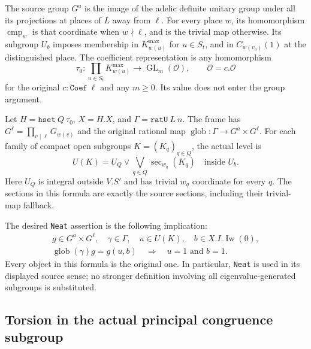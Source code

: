The source group \(G^a\) is the image of the adelic definite unitary
group under all its projections at places of \(L\) away from \(\ell\).
For every place \(w\), its homomorphism \(\operatorname{cmp}_w\) is that
coordinate when \(w\nmid\ell\), and is the trivial map otherwise.
Its subgroup \(U_b\) imposes membership in \(K_{w(u)}^{\max}\) for
\(u\in S_t\), and in \(C_{w(v_0)}(1)\) at the distinguished place.
The coefficient representation is any homomorphism
\[
 \tau _0:\prod_{u\in S_t}K_{w(u)}^{\max}
                  \longrightarrow\operatorname{GL}_m(\mathcal O),
 \qquad \mathcal O=c.\mathcal O
\]
for the original \(c:\texttt{Coef}\ \ell\) and any \(m\ge0\).
Its value does not enter the group argument.

Let \(H=\texttt{hset}\ Q\ \tau _0\), \(X=H.X\), and
\(\Gamma=\texttt{ratU}\ L\ n\).  The frame has
\(G^\ell=\prod_{v\mid\ell}G_{w(v)}\) and the original rational map
\(\operatorname{glob}:\Gamma\longrightarrow G^a\times G^\ell\).
For each family of compact open subgroups \(K=(K_q)_{q\in Q}\),
the actual level is
\begin{equation}\label{eq:ntl-level}
 U(K)=U_Q\vee\bigvee_{q\in Q}\operatorname{sec}_{w_q}(K_q)
                  \quad\text{inside }U_b.
\end{equation}
Here \(U_Q\) is integral outside \(V.S'\) and has trivial \(w_q\)
coordinate for every \(q\).  The sections in this formula are exactly
the source sections, including their trivial-map fallback.

The desired \texttt{Neat} assertion is the following implication:
\begin{equation}\label{eq:ntl-neat}
 \begin{gathered}
 g\in G^a\times G^\ell,\quad\gamma\in\Gamma,\quad
 u\in U(K),\quad b\in X.I.\operatorname{Iw}(0),\\
 \operatorname{glob}(\gamma)g=g(u,b)
       \quad\Longrightarrow\quad u=1\text{ and }b=1.
 \end{gathered}
\end{equation}
Every object in this formula is the original one.  In particular,
\texttt{Neat} is used in its displayed source sense; no stronger
definition involving all eigenvalue-generated subgroups is substituted.

\subsection{Torsion in the actual principal congruence subgroup}

